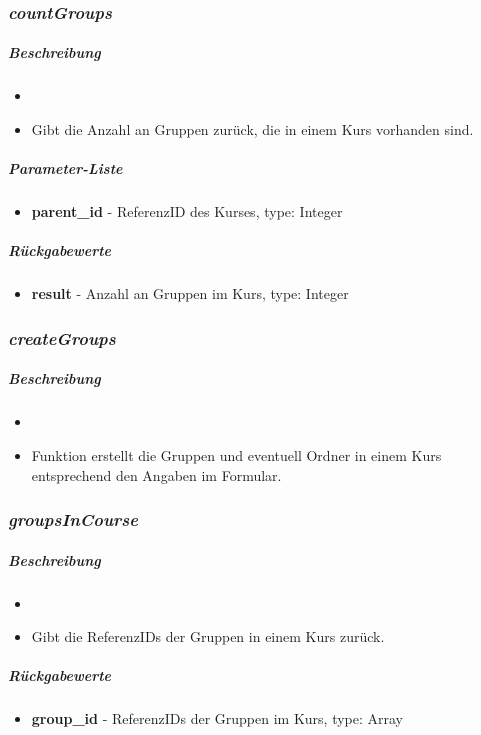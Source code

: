 \subsubsection*{\textit{countGroups}}\label{countGroupsGGUI}
\subparagraph{Beschreibung}
\begin{itemize}
	\item[] \noindent{}
	\item[] Gibt die Anzahl an Gruppen zurück, die in einem Kurs vorhanden sind.
\end{itemize}
\subparagraph{Parameter-Liste}
\begin{itemize}
	\item[] \textbf{parent\_id} - ReferenzID des Kurses, type: Integer
\end{itemize}
\subparagraph{Rückgabewerte}
\begin{itemize}
	\item[] \textbf{result} - Anzahl an Gruppen im Kurs, type: Integer
\end{itemize}

\subsubsection*{\textit{createGroups}}\label{createGroupsGGUI}
\subparagraph{Beschreibung}
\begin{itemize}
	\item[] \noindent{}
	\item[] Funktion erstellt die Gruppen und eventuell Ordner in einem Kurs entsprechend den Angaben im Formular. 
\end{itemize}

\subsubsection*{\textit{groupsInCourse}}\label{groupsInCourseGGUI}
\subparagraph{Beschreibung}
\begin{itemize}
	\item[] \noindent{}
	\item[] Gibt die ReferenzIDs der Gruppen in einem Kurs zurück.
\end{itemize}
\subparagraph{Rückgabewerte}
\begin{itemize}
	\item[] \textbf{group\_id} - ReferenzIDs der Gruppen im Kurs, type: Array
\end{itemize}


